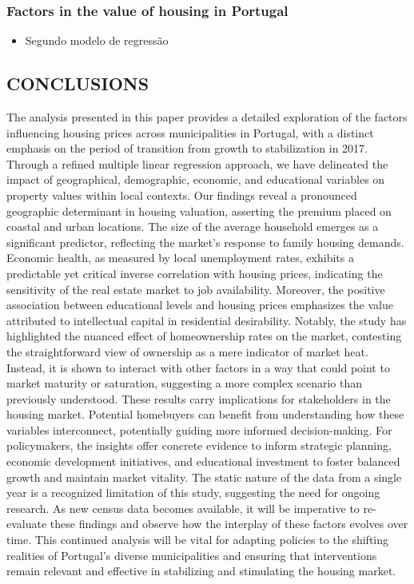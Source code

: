 \documentclass{aip-cp}
\begin{document}
\subsubsection{Factors in
the value of housing in Portugal}

\begin{itemize}
    \item Segundo modelo de regressão
\end{itemize}



\subsection{\uppercase{Conclusions}}

The analysis presented in this paper provides a detailed exploration of the factors influencing housing prices across municipalities in Portugal, with a distinct emphasis on the period of transition from growth to stabilization in 2017. Through a refined multiple linear regression approach, we have delineated the impact of geographical, demographic, economic, and educational variables on property values within local contexts.
Our findings reveal a pronounced geographic determinant in housing valuation, asserting the premium placed on coastal and urban locations. The size of the average household emerges as a significant predictor, reflecting the market's response to family housing demands. Economic health, as measured by local unemployment rates, exhibits a predictable yet critical inverse correlation with housing prices, indicating the sensitivity of the real estate market to job availability. Moreover, the positive association between educational levels and housing prices emphasizes the value attributed to intellectual capital in residential desirability.
Notably, the study has highlighted the nuanced effect of homeownership rates on the market, contesting the straightforward view of ownership as a mere indicator of market heat. Instead, it is shown to interact with other factors in a way that could point to market maturity or saturation, suggesting a more complex scenario than previously understood.
These results carry implications for stakeholders in the housing market. Potential homebuyers can benefit from understanding how these variables interconnect, potentially guiding more informed decision-making. For policymakers, the insights offer concrete evidence to inform strategic planning, economic development initiatives, and educational investment to foster balanced growth and maintain market vitality.
The static nature of the data from a single year is a recognized limitation of this study, suggesting the need for ongoing research. As new census data becomes available, it will be imperative to re-evaluate these findings and observe how the interplay of these factors evolves over time. This continued analysis will be vital for adapting policies to the shifting realities of Portugal's diverse municipalities and ensuring that interventions remain relevant and effective in stabilizing and stimulating the housing market.
\end{document}
